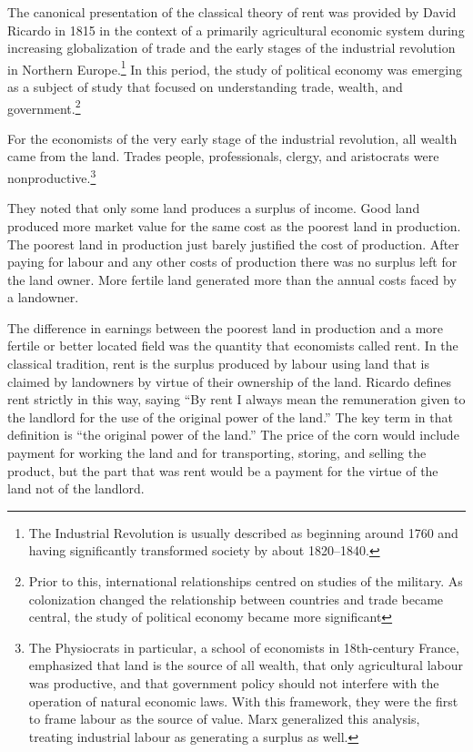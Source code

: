 The canonical presentation of the classical theory of rent \cite{ricardoEssayInfluenceLow1815} was provided by David Ricardo in 1815 in the context of a primarily agricultural economic system during increasing globalization of trade and the early stages of the industrial revolution in Northern Europe.\footnote{The Industrial Revolution is usually described as beginning around 1760 and having significantly transformed society by about 1820–1840.} In this period, the study of \gls{political economy} was emerging as a subject of study that focused on understanding trade, wealth, and government.\footnote{Prior to this, international relationships centred on studies of the military. As colonization changed the relationship between countries and trade became central, the study of \gls{political economy} became more significant}

For the economists of the very early stage of the industrial revolution, %
all wealth came from the land. Trades people, professionals, clergy, and aristocrats were %
nonproductive.\footnote{The Physiocrats in particular, a school of economists in 18th-century France, emphasized  that land is the source of all wealth, that only agricultural labour was productive, and that government policy should not interfere with the operation of natural economic laws. With this framework, they were the first to frame labour as the source of value. Marx generalized this analysis, treating industrial labour as generating a surplus as well.}

They noted that only some land produces a surplus of income. Good land produced more market value for the same cost as the poorest land in production. The poorest land in production just barely justified the cost of production. After paying for labour and any other costs of production there was no surplus left for the land owner. More fertile land generated more than the annual costs faced by a landowner. 

The difference in earnings between the poorest land in production and a more fertile or better located field was the quantity that economists called rent. In the classical tradition, rent is the surplus produced by labour using land that is claimed by landowners by virtue of their ownership of the land. Ricardo defines rent strictly in this way, saying ``By rent I always mean the remuneration given to the landlord for the use of the original power of the land.''\cite{ricardoEssayInfluenceLow1815} The key term in that definition is ``the original power of the land.'' The price of the corn would include payment for working the land and for transporting, storing, and  selling the product, but the part that was rent would be a payment for the virtue of the land not of the landlord. %
  
